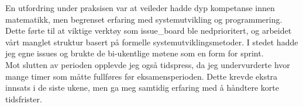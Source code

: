 En utfordring under praksisen var at veileder hadde dyp kompetanse innen matematikk, men begrenset erfaring med systemutvikling og programmering. Dette førte til at viktige verktøy som \gls{issue_board} ble nedprioritert, og arbeidet vårt manglet struktur basert på formelle systemutviklingsmetoder. I stedet hadde jeg egne \gls{issue}s og brukte de bi-ukentlige møtene som en form for \gls{sprint}. \\

Mot slutten av perioden opplevde jeg også tidspress, da jeg undervurderte hvor mange timer som måtte fullføres før eksamensperioden. Dette krevde ekstra innsats i de siste ukene, men ga meg samtidig erfaring med å håndtere korte tidsfrister.


